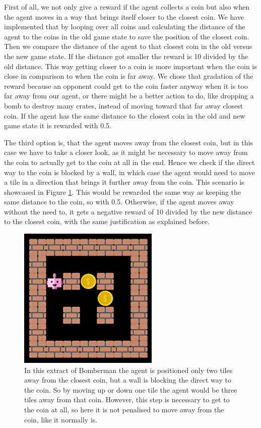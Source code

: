 First of all, we not only give a reward if the agent collects a coin but also when the agent moves in a way that brings itself closer to the closest coin. We have implemented that by looping over all coins and calculating the distance of the agent to the coins in the old game state to save the position of the closest coin. Then we compare the distance of the agent to that closest coin in the old versus the new game state. If the distance got smaller the reward is 10 divided by the old distance. This way getting closer to a coin is more important when the coin is close in comparison to when the coin is far away. We chose that gradation of the reward because an opponent could get to the coin faster anyway when it is too far away from our agent, or there might be a better action to do, like dropping a bomb to destroy many crates, instead of moving toward that far away closest coin. If the agent has the same distance to the closest coin in the old and new game state it is rewarded with 0.5. 

The third option is, that the agent moves away from the closest coin, but in this case we have to take a closer look, as it might be necessary to move away from the coin to actually get to the coin at all in the end. Hence we check if the direct way to the coin is blocked by a wall, in which case the agent would need to move a tile in a direction that brings it further away from the coin. This scenario is showcased in Figure \ref{fig:coin-blocked}. This would be rewarded the same way as keeping the same distance to the coin, so with 0.5. Otherwise, if the agent moves away without the need to, it gets a negative reward of 10 divided by the new distance to the closest coin, with the same justification as explained before.

\begin{figure}[H]
	\centering
	\includegraphics{images/coin_blocked.png}
	\caption{In this extract of Bomberman the agent is positioned only two tiles away from the closest coin, but a wall is blocking the direct way to the coin. So by moving up or down one tile the agent would be three tiles away from that coin. However, this step is necessary to get to the coin at all, so here it is not penalised to move away from the coin, like it normally is.}
	\label{fig:coin-blocked}
\end{figure}

